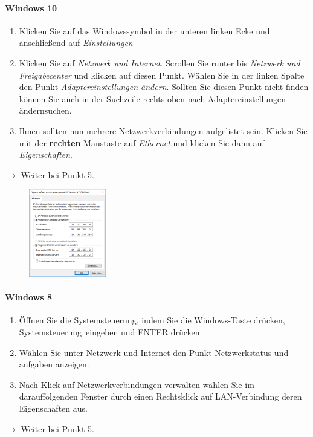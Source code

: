 \documentclass[a4paper,12pt]{scrartcl}
\begin{document}
\paragraph*{Windows 10}
\begin{enumerate}
	\item Klicken Sie auf das Windowssymbol in der unteren linken Ecke und anschließend auf \emph{Einstellungen}
	\item Klicken Sie auf \textit{Netzwerk und Internet}. Scrollen Sie runter bis \textit{Netzwerk und Freigabecenter} und klicken auf diesen Punkt. Wählen Sie in der linken Spalte den Punkt \textit{Adaptereinstellungen ändern}. Sollten Sie diesen Punkt nicht finden können Sie auch in der Suchzeile rechts oben nach \glqq Adaptereinstellungen ändern\grqq suchen.

    \item Ihnen sollten nun mehrere Netzwerkverbindungen aufgelistet sein. Klicken Sie mit der \textbf{rechten} Maustaste auf \textit{Ethernet} und klicken Sie dann auf \textit{Eigenschaften}.
\end{enumerate}
$\rightarrow$ Weiter bei Punkt 5.


\begin{figure}
\centering
  \includegraphics[width=0.3\textwidth]{Bilder/IP_Windows}
\end{figure}



\paragraph*{Windows 8}
\begin{enumerate}
	\item Öffnen Sie die Systemsteuerung, indem Sie die Windows-Taste drücken, \glqq Systemsteuerung\grqq  \ eingeben und ENTER drücken
	\item Wählen Sie unter Netzwerk und Internet den Punkt Netzwerkstatus und -aufgaben anzeigen.
    \item Nach Klick auf Netzwerkverbindungen verwalten wählen Sie im darauffolgenden Fenster durch einen Rechtsklick auf LAN-Verbindung deren Eigenschaften aus.
\end{enumerate}
$\rightarrow$ Weiter bei Punkt 5.
\end{document}
